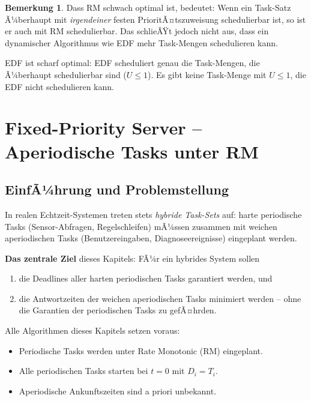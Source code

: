 ﻿\documentclass[a4paper,12pt]{report}
\theoremstyle{definition}
\newtheorem{bemerkung}{Bemerkung}[chapter]
\begin{document}
\begin{bemerkung}
	Dass RM schwach optimal ist, bedeutet: Wenn ein Task-Satz Ã¼berhaupt
	mit \emph{irgendeiner} festen PrioritÃ¤tszuweisung schedulierbar ist, so
	ist er auch mit RM schedulierbar. Das schlieÃŸt jedoch nicht aus, dass
	ein dynamischer Algorithmus wie EDF mehr Task-Mengen schedulieren kann.

	EDF ist scharf optimal: EDF scheduliert genau die Task-Mengen, die
	Ã¼berhaupt schedulierbar sind ($U \leq 1$). Es gibt keine Task-Menge
	mit $U \leq 1$, die EDF nicht schedulieren kann.
\end{bemerkung}

\chapter{Fixed-Priority Server -- Aperiodische Tasks unter RM}
\label{chap:server}

\section{EinfÃ¼hrung und Problemstellung}

In realen Echtzeit-Systemen treten stets \emph{hybride Task-Sets} auf: harte
periodische Tasks (Sensor-Abfragen, Regelschleifen) mÃ¼ssen zusammen mit weichen
aperiodischen Tasks (Benutzereingaben, Diagnoseereignisse) eingeplant werden.

\textbf{Das zentrale Ziel} dieses Kapitels: FÃ¼r ein hybrides System sollen
\begin{enumerate}
	\item die Deadlines aller harten periodischen Tasks garantiert werden, und
	\item die Antwortzeiten der weichen aperiodischen Tasks minimiert werden --
	      ohne die Garantien der periodischen Tasks zu gefÃ¤hrden.
\end{enumerate}

Alle Algorithmen dieses Kapitels setzen voraus:
\begin{itemize}
	\item Periodische Tasks werden unter Rate Monotonic (RM) eingeplant.
	\item Alle periodischen Tasks starten bei $t=0$ mit $D_i = T_i$.
	\item Aperiodische Ankunftszeiten sind a priori unbekannt.
\end{itemize}
\end{document}
